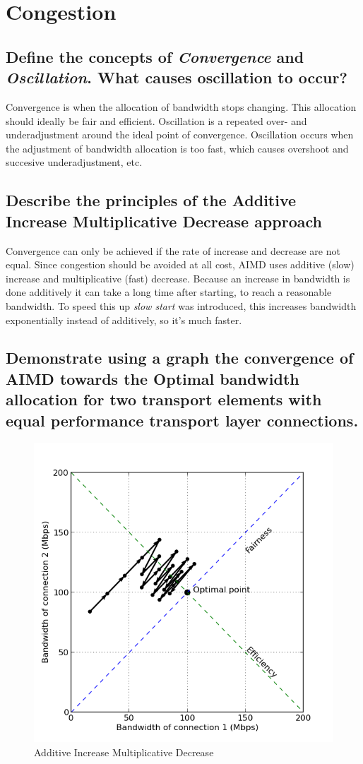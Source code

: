 \documentclass[9pt, a4paper, oneside]{article}
\begin{document}
\newpage

\section{Congestion}

\subsection{Define the concepts of \emph{Convergence} and \emph{Oscillation}.
            What causes oscillation to occur?}

Convergence is when the allocation of bandwidth stops changing.
This allocation should ideally be fair and efficient.
Oscillation is a repeated over- and underadjustment around the ideal point of
convergence.
Oscillation occurs when the adjustment of bandwidth allocation is too fast,
which causes overshoot and succesive underadjustment, etc.

\subsection{Describe the principles of the Additive Increase Multiplicative
            Decrease approach}

Convergence can only be achieved if the rate of increase and decrease are not
equal.
Since congestion should be avoided at all cost, AIMD uses additive (slow)
increase and multiplicative (fast) decrease.
Because an increase in bandwidth is done additively it can take a long time
after starting, to reach a reasonable bandwidth.
To speed this up \emph{slow start} was introduced, this increases bandwidth
exponentially instead of additively, so it's much faster.

\subsection{Demonstrate using a graph the convergence of AIMD towards the
            Optimal bandwidth allocation for two transport elements with
            equal performance transport layer connections.}

\begin{figure}[h]
\centering
\includegraphics[scale=0.6]{aimd.png}
\caption{Additive Increase Multiplicative Decrease}
\end{figure}
\end{document}

